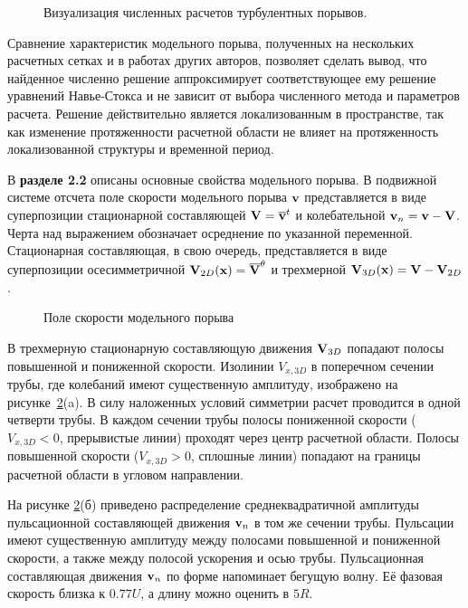 \begin{figure}[h]
\caption{Визуализация численных расчетов турбулентных порывов.}
\label{3D_img}
\end{figure}


Сравнение характеристик модельного порыва, полученных на нескольких расчетных сетках и в работах других авторов, позволяет сделать вывод, что найденное численно решение аппроксимирует соответствующее ему решение уравнений Навье-Стокса и не зависит от выбора численного метода и параметров расчета. Решение действительно является локализованным в пространстве, так как изменение протяженности расчетной области не влияет на протяженность локализованной структуры и временной период. 


В \textbf{разделе 2.2} описаны основные свойства модельного порыва. В подвижной системе отсчета поле скорости модельного порыва $\mathbf{v}$ представляется в виде суперпозиции стационарной составляющей $\mathbf{V} = \overline{\mathbf{v}}^t$ и колебательной $\mathbf{v}_n = \mathbf{v} - \mathbf{V}$. Черта над выражением обозначает осреднение по указанной переменной. Стационарная составляющая, в свою очередь, представляется в виде суперпозиции осесимметричной $\mathbf{V}_{2D}(\mathbf{x}) = \overline{\mathbf{V}}^{\theta}$ и трехмерной $\mathbf{V}_{3D}(\mathbf{x}) = \mathbf{V} - \mathbf{V}_{2D}$. 

\begin{figure}[h]
\caption{Поле скорости модельного порыва}
\label{mp_cs_pic}
\end{figure}

В трехмерную стационарную составляющую движения $\mathbf{V}_{3D}$ попадают полосы повышенной и пониженной скорости. Изолинии $V_{x, 3D}$ в поперечном сечении трубы, где колебаний имеют существенную амплитуду, изображено на рисунке~\ref{mp_cs_pic}(a). В силу наложенных условий симметрии расчет проводится в одной четверти трубы. В каждом сечении трубы полосы пониженной скорости ($V_{x,3D} < 0$, прерывистые линии) проходят через центр расчетной области. Полосы повышенной скорости ($V_{x,3D} > 0$, сплошные линии) попадают на границы расчетной области в угловом направлении. 

На рисунке \ref{mp_cs_pic}(б) приведено распределение среднеквадратичной амплитуды пульсационной составляющей движения $\mathbf{v}_n$ в том же сечении трубы. Пульсации имеют существенную амплитуду между полосами повышенной и пониженной скорости, а также между полосой ускорения и осью трубы. Пульсационная составляющая движения $\mathbf{v}_n$ по форме напоминает бегущую волну. Её фазовая скорость близка к $0.77U$, а длину можно оценить в $5R$. 

